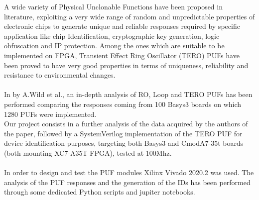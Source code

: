 
A wide variety of Physical Unclonable Functions have been proposed in literature, exploiting
a very wide range of random and unpredictable properties of electronic chips to generate unique and reliable
responses required by specific application like chip Identification, cryptographic key generation, logic obfuscation
and IP protection. Among the ones which are suitable to be implemented on FPGA, Transient Effect Ring Oscillator (TERO) 
PUFs have been proved to have very good properties in terms of uniqueness, reliability and resistance to
environmental changes.\\\\
In \cite{ref_pap} by A.Wild et al., an in-depth analysis of RO, Loop and TERO PUFs has been performed comparing
the responses coming from 100 Basys3 boards on which 1280 PUFs were implemented. \\
Our project consists in a further analysis of the data acquired by the authors of the paper, followed by a SystemVerilog
implementation of the TERO PUF for device identification purposes, targeting both Basys3 and CmodA7-35t boards 
(both mounting XC7-A35T FPGA), tested at 100Mhz. \\\\
In order to design and test the PUF modules Xilinx Vivado 2020.2 was used. The analysis of the PUF responses and
the generation of the IDs has been performed through some dedicated Python scripts and jupiter notebooks.\\
